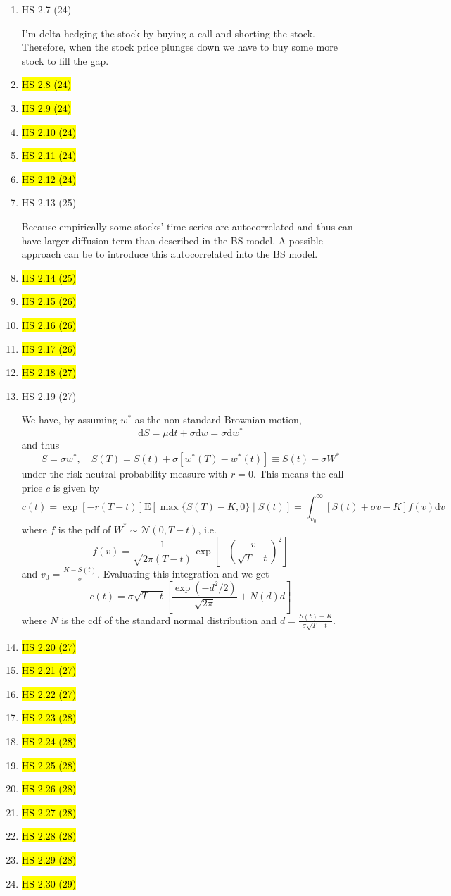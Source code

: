 \documentclass[11pt]{article}
\newcommand{\E}{\text{E}}
\renewcommand{\d}{\text{d}}
\newenvironment{note}{\begin{enumerate}[leftmargin=1em,topsep=0pt,noitemsep]}{\end{enumerate}}
\newcommand{\solution}{\boxed{\textbf{SOLUTION}}\hspace{.5em}}
\begin{document}
\begin{spacing}{1.1}
\begin{note}
\item HS 2.7 (24)

\solution I'm delta hedging the stock by buying a call and shorting the stock. Therefore, when the stock price plunges down we have to buy some more stock to fill the gap.

\item \hl{HS 2.8 (24)}
\item \hl{HS 2.9 (24)}
\item \hl{HS 2.10 (24)}
\item \hl{HS 2.11 (24)}
\item \hl{HS 2.12 (24)}

\item HS 2.13 (25)

\solution Because empirically some stocks' time series are autocorrelated and thus can have larger diffusion term than described in the BS model. A possible approach can be to introduce this autocorrelated into the BS model.

\item \hl{HS 2.14 (25)}
\item \hl{HS 2.15 (26)}
\item \hl{HS 2.16 (26)}
\item \hl{HS 2.17 (26)}
\item \hl{HS 2.18 (27)}

\item HS 2.19 (27)

\solution We have, by assuming $w^*$ as the non-standard Brownian motion,
$$
\d S = \mu\d t + \sigma\d w = \sigma\d w^*
$$
and thus
$$
S = \sigma w^*,\quad  S(T)=  S(t) + \sigma[w^*(T)- w^*(t) ] \equiv S(t) + \sigma W^*
$$
under the risk-neutral probability measure with $r=0$.
This means the call price $c$ is given by
$$
c(t) = \exp[-r(T-t)]\E[\max\{S(T)-K, 0\}\mid S(t)] = \int_{v_0}^{\infty}[S(t) + \sigma v - K]f(v)\d v
$$
where $f$ is the pdf of $W^*\sim\mathcal{N}(0,T-t)$, i.e.
$$
f(v) = \frac{1}{\sqrt{2\pi(T-t)}}\exp\left[-\left(\frac{v}{\sqrt{T-t}}\right)^2\right]
$$
and $v_0 = \frac{K-S(t)}{\sigma}$.
Evaluating this integration and we get
$$
c(t) = \sigma\sqrt{T-t}\left[\frac{\exp(-d^2/2)}{\sqrt{2\pi}}+N(d)d\right]
$$
where $N$ is the cdf of the standard normal distribution and $d = \frac{S(t)-K}{\sigma\sqrt{T-t}}$.

\item \hl{HS 2.20 (27)}
\item \hl{HS 2.21 (27)}
\item \hl{HS 2.22 (27)}
\item \hl{HS 2.23 (28)}
\item \hl{HS 2.24 (28)}
\item \hl{HS 2.25 (28)}
\item \hl{HS 2.26 (28)}
\item \hl{HS 2.27 (28)}
\item \hl{HS 2.28 (28)}
\item \hl{HS 2.29 (28)}
\item \hl{HS 2.30 (29)}


\end{note}
\end{spacing}
\end{document}
